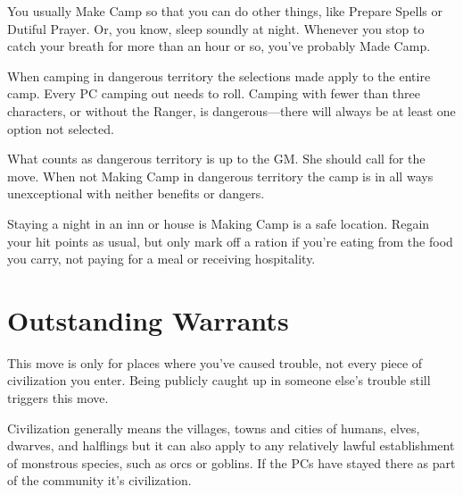 You usually Make Camp so that you can do other things, like Prepare Spells or Dutiful Prayer. Or, you know, sleep soundly at night. Whenever you stop to catch your breath for more than an hour or so, you've probably Made Camp.

       

When camping in dangerous territory the selections made apply to the entire camp. Every PC camping out needs to roll. Camping with fewer than three characters, or without the Ranger, is dangerous—there will always be at least one option not selected.

       

What counts as dangerous territory is up to the GM. She should call for the move. When not Making Camp in dangerous territory the camp is in all ways unexceptional with neither benefits or dangers.

       

Staying a night in an inn or house is Making Camp is a safe location. Regain your hit points as usual, but only mark off a ration if you're eating from the food you carry, not paying for a meal or receiving hospitality.

       
\section{Outstanding Warrants}   
       

This move is only for places where you've caused trouble, not every piece of civilization you enter. Being publicly caught up in someone else's trouble still triggers this move.

       

Civilization generally means the villages, towns and cities of humans, elves, dwarves, and halflings but it can also apply to any relatively lawful establishment of monstrous species, such as orcs or goblins. If the PCs have stayed there as part of the community it's civilization.

                       
